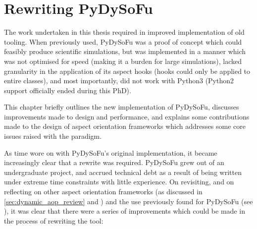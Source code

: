 \chapter{Rewriting PyDySoFu}


The work undertaken in this thesis required in improved implementation of old
tooling. When previously used, PyDySoFu was a proof of concept which could
feasibly produce scientific simulations, but was implemented in a manner which
was not optimised for speed (making it a burden for large simulations), lacked
granularity in the application of its aspect hooks (hooks could only be applied
to entire classes), and most importantly, did not work with Python3 (Python2
support officially ended during this PhD). 

This chapter briefly outlines the new implementation of PyDySoFu, discusses
improvements made to design and performance, and explains some contributions
made to the design of aspect orientation frameworks which addresses some core
issues raised with the paradigm. 



As time wore on with PyDySoFu's original implementation, it became increasingly
clear that a rewrite was required. PyDySoFu grew out of an undergraduate
project, and accrued technical debt as a result of being written under extreme
time constraints with little experience. On revisiting, and on reflecting on
other aspect orientation frameworks (as discussed in
\cref{sec:dynamic_aop_review} and \cite{dynamicAOchitchyan}) and the use
previously found for PyDySoFu (see \cite{wallis2018caise, wallis2018genetic}),
it was clear that there were a series of improvements which could be made in the
process of rewriting the tool:

